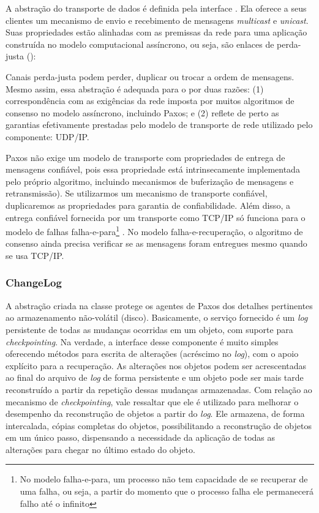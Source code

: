 A abstração do transporte de dados é definida pela interface . Ela
oferece a seus clientes um mecanismo de envio e recebimento de mensagens \emph{multicast}
e \emph{unicast}. Suas propriedades estão alinhadas com as premissas da rede para uma
aplicação construída no modelo computacional assíncrono, ou seja, são enlaces de
perda-justa (\cite{sec:modelo_computacional}):

Canais perda-justa podem perder, duplicar ou trocar a ordem de mensagens. Mesmo assim,
essa abstração é adequada para o  por duas razões: (1)
correspondência com as exigências da rede imposta por muitos algoritmos de consenso no
modelo assíncrono, incluindo Paxos; e (2) reflete de perto as garantias efetivamente
prestadas pelo modelo de transporte de rede utilizado pelo componente: UDP/IP.

Paxos não exige um modelo de transporte com propriedades de entrega de mensagens
confiável, pois essa propriedade está intrinsecamente implementada pelo próprio algoritmo,
incluindo mecanismos de buferização de mensagens e retransmissão). Se utilizarmos um
mecanismo de transporte confiável, duplicaremos as propriedades para garantia de
confiabilidade. Além disso, a entrega confiável fornecida por um transporte como TCP/IP só
funciona para o modelo de falhas falha-e-para\footnote{No modelo falha-e-para, um processo
não tem capacidade de se recuperar de uma falha, ou seja, a partir do momento que o
processo falha ele permanecerá falho até o infinito\cite{cachin11}} \cite{abdellatif04}.
No modelo falha-e-recuperação, o algoritmo de consenso ainda precisa verificar se as
mensagens foram entregues mesmo quando se usa TCP/IP.

\subsubsection{ChangeLog}

A abstração criada na classe  protege os agentes de Paxos dos
detalhes pertinentes ao armazenamento não-volátil (disco). Basicamente, o serviço
fornecido é um \emph{log} persistente de todas as mudanças ocorridas em um objeto, com
suporte para \emph{checkpointing}. Na verdade, a interface desse componente é muito
simples oferecendo métodos para escrita de alterações (acréscimo no \emph{log}), com o
apoio explícito para a recuperação. As alterações nos objetos podem ser acrescentadas ao
final do arquivo de \emph{log} de forma persistente e um objeto pode ser mais tarde
reconstruído a partir da repetição dessas mudanças armazenadas. Com relação ao mecanismo
de \emph{checkpointing}, vale ressaltar que ele é utilizado para melhorar o desempenho da
reconstrução de objetos a partir do \emph{log}. Ele armazena, de forma intercalada, cópias
completas do objetos, possibilitando a reconstrução de objetos em um único passo,
dispensando a necessidade da aplicação de todas as alterações para chegar no último estado
do objeto.


